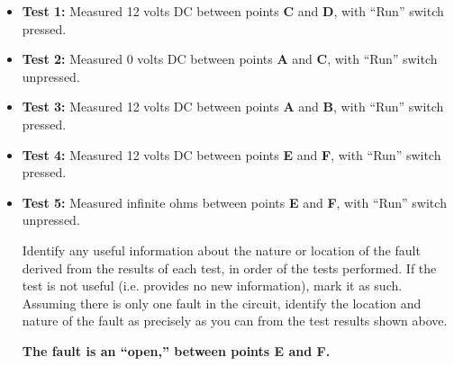 \begin{itemize}
\item{} {\bf Test 1:} Measured 12 volts DC between points {\bf C} and {\bf D}, with ``Run'' switch pressed.
\vskip 25pt
\item{} {\bf Test 2:} Measured 0 volts DC between points {\bf A} and {\bf C}, with ``Run'' switch unpressed.
\vskip 25pt
\item{} {\bf Test 3:} Measured 12 volts DC between points {\bf A} and {\bf B}, with ``Run'' switch pressed.
\vskip 25pt
\item{} {\bf Test 4:} Measured 12 volts DC between points {\bf E} and {\bf F}, with ``Run'' switch pressed.
\vskip 25pt
\item{} {\bf Test 5:} Measured infinite ohms between points {\bf E} and {\bf F}, with ``Run'' switch unpressed. 
\vskip 25pt
\medskip

Identify any useful information about the nature or location of the fault derived from the results of each test, in order of the tests performed.  If the test is not useful (i.e. provides no new information), mark it as such.  Assuming there is only one fault in the circuit, identify the location and nature of the fault as precisely as you can from the test results shown above.







{\bf The fault is an ``open,'' between points E and F.}








\end{itemize}
